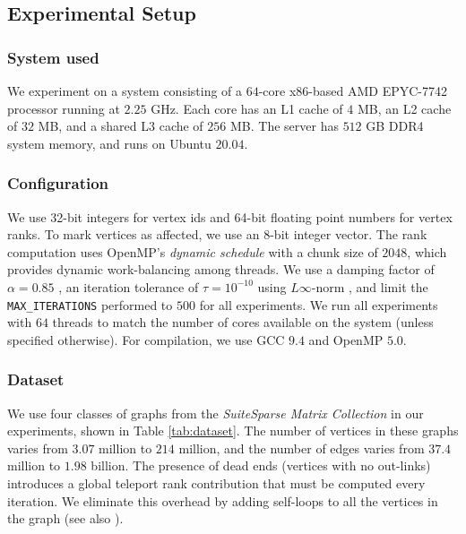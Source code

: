 \subsection{Experimental Setup}
\label{sec:setup}

\subsubsection{System used}

We experiment on a system consisting of a $64$-core x86-based AMD EPYC-7742 processor running at $2.25$ GHz. Each core has an L1 cache of $4$ MB, an L2 cache of $32$ MB, and a shared L3 cache of $256$ MB. The server has $512$ GB DDR4 system memory, and runs on Ubuntu $20.04$.


\subsubsection{Configuration}

We use 32-bit integers for vertex ids and 64-bit floating point numbers for vertex ranks. To mark vertices as affected, we use an 8-bit integer vector. The rank computation uses OpenMP's \textit{dynamic schedule} with a chunk size of $2048$, which provides dynamic work-balancing among threads. We use a damping factor of $\alpha = 0.85$ \cite{rank-langville06}, an iteration tolerance of $\tau = 10^{-10}$ \cite{rank-dubey22} using $L\infty$-norm \cite{rank-plimpton11}, and limit the \texttt{MAX\_ITERATIONS} performed to $500$ \cite{nvgraph} for all experiments. We run all experiments with $64$ threads to match the number of cores available on the system (unless specified otherwise). For compilation, we use GCC $9.4$ and OpenMP $5.0$.


\subsubsection{Dataset}

We use four classes of graphs from the \textit{SuiteSparse Matrix Collection} \cite{suite19} in our experiments, shown in Table \ref{tab:dataset}. The number of vertices in these graphs varies from $3.07$ million to $214$ million, and the number of edges varies from $37.4$ million to $1.98$ billion. The presence of dead ends (vertices with no out-links) introduces a global teleport rank contribution that must be computed every iteration. We eliminate this overhead by adding self-loops to all the vertices in the graph (see also \cite{rank-andersen07, rank-langville06}).


